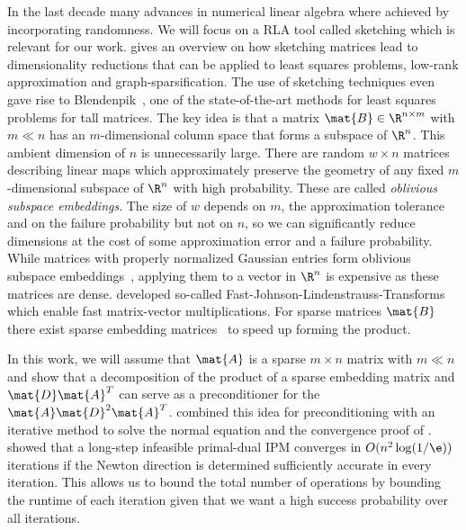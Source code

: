 In the last decade many advances in numerical linear algebra where achieved by incorporating randomness.
We will focus on a RLA tool called sketching which is relevant for our work.
\textcite{Woodruff-Sketching} gives an overview on how sketching matrices lead to dimensionality reductions that can be applied to least squares problems, low-rank approximation and graph-sparsification.
The use of sketching techniques even gave rise to Blendenpik~\cite{Avron-Blendenpik}, one of the state-of-the-art methods for least squares problems for tall matrices.
The key idea is that a matrix \(\mat{B} \in \R^{n \times m}\) with \(m \ll n\) has an \(m\)-dimensional column space that forms a subspace of \(\R^n\).
This ambient dimension of \(n\) is unnecessarily large.
There are random \(w \times n\) matrices describing linear maps which approximately preserve the geometry of any fixed \(m\)-dimensional subspace of \(\R^n\) with high probability.
These are called \emph{oblivious subspace embeddings}.
The size of \(w\) depends on \(m\), the approximation tolerance and on the failure probability but not on \(n\), so we can significantly reduce dimensions at the cost of some approximation error and a failure probability.
While matrices with properly normalized Gaussian entries form oblivious subspace embeddings~\cite[Theorem 6]{Woodruff-Sketching}, applying them to a vector in \(\R^n\) is expensive as these matrices are dense.
\textcite{AilonChazelle-FastJohnsonLindenstraussTransform} developed so-called Fast-Johnson-Lindenstrauss-Transforms which enable fast matrix-vector multiplications. For sparse matrices \(\mat{B}\) there exist sparse embedding matrices~\cite{Achlioptas-SparseSketching,Cohen-NearlyTightObliviousSubspaceEmbeddings} to speed up forming the product.

In this work, we will assume that \(\mat{A}\) is a sparse \(m \times n\) matrix with \(m \ll n\) and show that a decomposition of the product of a sparse embedding matrix and \(\mat{D}\mat{A}^T\) can serve as a preconditioner for the \(\mat{A}\mat{D}^2\mat{A}^T\).
\Textcite{Avron-FasterRandomizedInfeasibleIPMs} combined this idea for preconditioning with an iterative method to solve the normal equation and the convergence proof of \textcite{Monteiro-ConvergenceAnalysisLongStepInfeasibleIPMs}.
\Textcite{Monteiro-ConvergenceAnalysisLongStepInfeasibleIPMs} showed that a long-step infeasible primal-dual IPM converges in \(O(n^2 \log(1/\e))\) iterations if the Newton direction is determined sufficiently accurate in every iteration.
This allows us to bound the total number of operations by bounding the runtime of each iteration given that we want a high success probability over all iterations.

